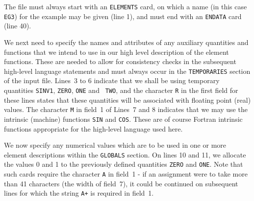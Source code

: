 \documentclass[a4paper]{article}
\begin{document}
The file  must always start  with an  {\tt ELEMENTS}
card,
on which a name (in this case {\tt EG3}) for  the example may be
given (line 1), and must end with an {\tt ENDATA}
card (line 40).

We  next need to specify the   names and  attributes of  any auxiliary
quantities  and functions that  we intend  to use   in  our high level
description  of the element  functions.
These are needed to  allow for consistency
checks  in  the subsequent high-level language statements
and must always occur in the  {\tt  TEMPORARIES}
section of the input  file.  Lines~3  to  6 indicate that  we shall be
using temporary quantities {\tt SINV1}, {\tt ZERO}, {\tt ONE} and {\tt
TWO}, and the character {\tt  R} in the  first field for  these lines
states that  these quantities will  be  associated with floating point
(real)  values. The character  {\tt M}   in field~1 of  Lines~7  and 8
indicates that we may  use the intrinsic (machine)
functions  {\tt SIN}
and {\tt COS}.  These are   of   course Fortran
intrinsic functions appropriate for the high-level language used here.

We now  specify any numerical  values which are to  be used in one  or
more element
descriptions within  the {\tt GLOBALS}
section.  On lines 10  and 11, we  allocate the values 0  and 1 to the
previously defined quantities {\tt ZERO} and {\tt ONE}. Note that such
cards
require the character {\tt A} in field~1 - if an assignment were
to take more than 41 characters  (the width  of  field~7), it could be
continued  on  subsequent lines  for  which the  string   {\tt  A+} is
required in field~1.
\end{document}
